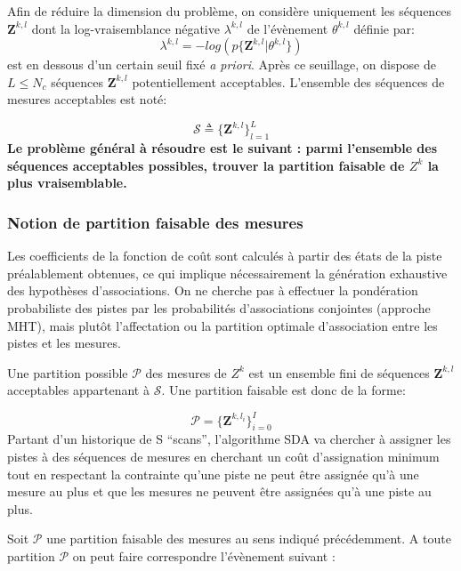 \documentclass[10pt,french,a4paper]{report}
\begin{document}
Afin de réduire la dimension du problème, on considère uniquement les séquences $ \mathbf{Z}^{k,l}$ dont la log-vraisemblance négative $\lambda^{k,l}$ de l'évènement $ \theta^{k,l}$  définie par:
\begin{equation}
\lambda^{k,l} =  -log \left( p\{\mathbf{Z}^{k,l}|\theta^{k,l} \}\right)
\end{equation}
est en dessous d'un certain seuil fixé \textit{a priori}. Après ce seuillage, on dispose
de $L \leq  N_c$ séquences $\mathbf{Z}^{k,l}$ potentiellement acceptables. L'ensemble des séquences de mesures acceptables est noté:

\begin{equation}
\mathcal{S} \triangleq \{\mathbf{Z}^{k,l}\}_{l=1}^L 
\end{equation}
\textbf{Le problème général à résoudre est le suivant :
parmi l'ensemble des séquences acceptables possibles, trouver la partition faisable de ${Z}^k$
la plus vraisemblable.}


\subsubsection{Notion de partition faisable des mesures}


Les coefficients de la fonction de coût sont calculés à partir des états de la piste préalablement obtenues, ce qui implique nécessairement la génération exhaustive des hypothèses d'associations. On ne cherche pas à effectuer la pondération probabiliste des pistes par les probabilités d'associations conjointes (approche \ac{MHT}), mais plutôt l'affectation ou la partition optimale d'association entre les pistes et les mesures. 


Une partition possible $\mathcal{P}$ des mesures de $Z^k$ est un ensemble fini de séquences $\mathbf{Z}^{k,l}$ acceptables appartenant à $\mathcal{S}$. Une partition faisable est donc de la forme:

\begin{equation}
\mathcal{P} = \{\mathbf{Z}^{k,l_i}\}_{i=0}^I
\end{equation}
Partant d'un historique de S ``scans'', l'algorithme \acf{SDA} va chercher à assigner les pistes à des séquences de mesures en cherchant un coût d'assignation minimum tout en respectant la contrainte qu'une piste ne peut être assignée qu'à une mesure au plus et que les mesures ne
peuvent être assignées qu'à une piste au plus. 

Soit $\mathcal{P}$ une partition faisable des mesures au sens indiqué précédemment. A toute partition $\mathcal{P}$  on peut faire correspondre l'évènement suivant :
\end{document}
